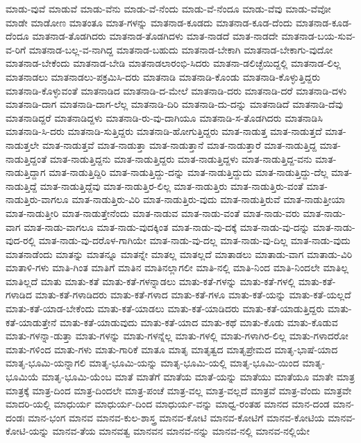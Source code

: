 {ಮಾಡು-ವುವೆ
ಮಾಡುವೆ
ಮಾಡು-ವೆನು
ಮಾಡು-ವೆ-ನೆಂದು
ಮಾಡು-ವೆ-ನೆಂದೂ
ಮಾಡು-ವೆವು
ಮಾಡು-ವೆವೋ
ಮಾಡೇ
ಮಾಡೋಣ
ಮಾತಂತೂ
ಮಾತ-ಗಳನ್ನು
ಮಾತನಾಡ-ಕೂಡದು
ಮಾತನಾಡ-ಕೂಡ-ದೆಂದು
ಮಾತನಾಡ-ಕೂಡ-ದೆಂದೂ
ಮಾತನಾಡ-ತೊಡಗಿದರು
ಮಾತನಾಡ-ತೊಡಗಿದಳು
ಮಾತ-ನಾಡದೆ
ಮಾತ-ನಾಡದೇ
ಮಾತನಾಡ-ಬಯ-ಸುವ-ವ-ರಿಗೆ
ಮಾತನಾಡ-ಬಲ್ಲ-ವ-ನಾಗಿದ್ದ
ಮಾತನಾಡ-ಬಹುದು
ಮಾತನಾಡ-ಬೇಕಾಗಿ
ಮಾತನಾಡ-ಬೇಕಾಗು-ವುದೋ
ಮಾತನಾಡ-ಬೇಕೆಂದು
ಮಾತನಾಡ-ಬೇಡಿ
ಮಾತನಾಡಲಾರಂಭಿ-ಸಿದರು
ಮಾತನಾ-ಡಲಿಚ್ಛೆಯಿದ್ದಲ್ಲಿ
ಮಾತನಾಡ-ಲಿಲ್ಲ
ಮಾತನಾಡಲು
ಮಾತನಾಡಲು-ಪಕ್ರಮಿಸಿ-ದರು
ಮಾತನಾಡಿ
ಮಾತನಾಡಿ-ಕೊಂಡು
ಮಾತನಾಡಿ-ಕೊಳ್ಳುತ್ತಿದ್ದರು
ಮಾತನಾಡಿ-ಕೊಳ್ಳುವಂತೆ
ಮಾತನಾಡಿದ
ಮಾತನಾಡಿ-ದ-ಮೇಲೆ
ಮಾತನಾಡಿ-ದರು
ಮಾತನಾಡಿ-ದರೆ
ಮಾತನಾಡಿ-ದಳು
ಮಾತನಾಡಿ-ದಾಗ
ಮಾತನಾಡಿ-ದಾಗ-ಲೆಲ್ಲ
ಮಾತನಾಡಿ-ದಿರಿ
ಮಾತನಾಡಿ-ದು-ದನ್ನು
ಮಾತನಾಡಿದೆ
ಮಾತನಾಡಿ-ದೆವು
ಮಾತನಾಡಿದ್ದರೆ
ಮಾತನಾಡಿದ್ದಳು
ಮಾತನಾಡಿ-ರು-ವು-ದಾಗಿಯೂ
ಮಾತನಾಡಿ-ಸ-ತೊಡಗಿದರು
ಮಾತನಾಡಿಸಿ
ಮಾತನಾಡಿ-ಸಿ-ದರು
ಮಾತನಾಡಿ-ಸುತ್ತಿದ್ದರು
ಮಾತನಾಡಿ-ಹೋಗುತ್ತಿದ್ದರು
ಮಾತ-ನಾಡುತ್ತ
ಮಾತ-ನಾಡುತ್ತದೆ
ಮಾತ-ನಾಡುತ್ತಲೇ
ಮಾತ-ನಾಡುತ್ತವೆ
ಮಾತ-ನಾಡುತ್ತಾ
ಮಾತ-ನಾಡುತ್ತಾನೆ
ಮಾತ-ನಾಡುತ್ತಾರೆ
ಮಾತ-ನಾಡುತ್ತಿದ್ದ
ಮಾತ-ನಾಡುತ್ತಿದ್ದಂತೆ
ಮಾತ-ನಾಡುತ್ತಿದ್ದನು
ಮಾತ-ನಾಡುತ್ತಿದ್ದರು
ಮಾತ-ನಾಡುತ್ತಿದ್ದಳು
ಮಾತ-ನಾಡುತ್ತಿದ್ದ-ವನು
ಮಾತ-ನಾಡುತ್ತಿದ್ದಾಗ
ಮಾತ-ನಾಡುತ್ತಿದ್ದಿರಿ
ಮಾತ-ನಾಡುತ್ತಿದ್ದು-ದನ್ನು
ಮಾತ-ನಾಡುತ್ತಿದ್ದುದು
ಮಾತ-ನಾಡುತ್ತಿದ್ದು-ದೆಲ್ಲ
ಮಾತ-ನಾಡುತ್ತಿದ್ದೆ
ಮಾತ-ನಾಡುತ್ತಿದ್ದೆವು
ಮಾತ-ನಾಡುತ್ತಿರ-ಲಿಲ್ಲ
ಮಾತ-ನಾಡುತ್ತಿರು
ಮಾತ-ನಾಡುತ್ತಿರು-ವಂತೆ
ಮಾತ-ನಾಡುತ್ತಿರು-ವಾಗಲೂ
ಮಾತ-ನಾಡುತ್ತಿರು-ವಿರಿ
ಮಾತ-ನಾಡುತ್ತಿರು-ವುದು
ಮಾತ-ನಾಡುತ್ತಿರುವೆ
ಮಾತ-ನಾಡುತ್ತೀಯಾ
ಮಾತ-ನಾಡುತ್ತೀರಿ
ಮಾತ-ನಾಡುತ್ತೇನೆಂದು
ಮಾತ-ನಾಡುವ
ಮಾತ-ನಾಡು-ವಂತೆ
ಮಾತ-ನಾಡು-ವರು
ಮಾತ-ನಾಡು-ವಾಗ
ಮಾತ-ನಾಡು-ವಾಗಲೂ
ಮಾತ-ನಾಡು-ವುದಕ್ಕಿಂತ
ಮಾತ-ನಾಡು-ವು-ದಕ್ಕೆ
ಮಾತ-ನಾಡು-ವು-ದನ್ನು
ಮಾತ-ನಾಡು-ವುದ-ರಲ್ಲಿ
ಮಾತ-ನಾಡು-ವು-ದರೊಳ-ಗಾಗಿಯೇ
ಮಾತ-ನಾಡು-ವು-ದಲ್ಲ
ಮಾತ-ನಾಡು-ವು-ದಿಲ್ಲ
ಮಾತ-ನಾಡು-ವುದು
ಮಾತನಾಡೆಂದು
ಮಾತನ್ನು
ಮಾತನ್ನೂ
ಮಾತನ್ನೇ
ಮಾತಲ್ಲ
ಮಾತಲ್ಲದೆ
ಮಾತಾಡಲು
ಮಾತಾಡು-ವಾಗ
ಮಾತಾಡು-ವಿರಿ
ಮಾತಾಳಿ-ಗಳು
ಮಾತಿ-ಗಿಂತ
ಮಾತಿಗೆ
ಮಾತಿನ
ಮಾತಿನಲ್ಲಾಗಲೀ
ಮಾತಿ-ನಲ್ಲಿ
ಮಾತಿ-ನಿಂದ
ಮಾತಿ-ನಿಂದಲೇ
ಮಾತಿಲ್ಲ
ಮಾತಿಲ್ಲದೆ
ಮಾತು
ಮಾತು-ಕತೆ
ಮಾತು-ಕತೆ-ಗಳನ್ನಾಡಲು
ಮಾತು-ಕತೆ-ಗಳನ್ನು
ಮಾತು-ಕತೆ-ಗಳಲ್ಲಿ
ಮಾತು-ಕತೆ-ಗಳಾಡಿದ
ಮಾತು-ಕತೆ-ಗಳಾಡಿದರು
ಮಾತು-ಕತೆ-ಗಳಾದ
ಮಾತು-ಕತೆ-ಗಳೂ
ಮಾತು-ಕತೆ-ಯನ್ನು
ಮಾತು-ಕತೆ-ಯಲ್ಲದೆ
ಮಾತು-ಕತೆ-ಯಾಡ-ಬೇಕೆಂದು
ಮಾತು-ಕತೆ-ಯಾಡಲು
ಮಾತು-ಕತೆ-ಯಾಡಿದರು
ಮಾತು-ಕತೆ-ಯಾಡುತ್ತಿದ್ದರು
ಮಾತು-ಕತೆ-ಯಾಡುತ್ತೇನೆ
ಮಾತು-ಕತೆ-ಯಾಡುವುದು
ಮಾತು-ಕತೆ-ಯಾದ
ಮಾತು-ಕಥೆ
ಮಾತು-ಕೊಡು
ಮಾತು-ಕೊಡುವ
ಮಾತು-ಗಳನ್ನಾ-ಡುತ್ತಾ
ಮಾತು-ಗಳನ್ನು
ಮಾತು-ಗಳನ್ನೆಲ್ಲ
ಮಾತು-ಗಳಲ್ಲಿ
ಮಾತು-ಗಳಾಗಿರ-ಲಿಲ್ಲ
ಮಾತು-ಗಳಾದರೋ
ಮಾತು-ಗಳಿಂದ
ಮಾತು-ಗಳು
ಮಾತು-ಗಾರಿಕೆ
ಮಾತೂ
ಮಾತೃ
ಮಾತೃತ್ವದ
ಮಾತೃಪ್ರೇಮದ
ಮಾತೃ-ಭಾಷೆ-ಯಾದ
ಮಾತೃ-ಭೂಮಿ-ಯನ್ನಾಗಲಿ
ಮಾತೃ-ಭೂಮಿ-ಯನ್ನು
ಮಾತೃ-ಭೂಮಿ-ಯಲ್ಲಿ
ಮಾತೃ-ಭೂಮಿ-ಯಿಂದ
ಮಾತೃ-ಭೂಮಿಯೆ
ಮಾತೃ-ಭೂಮಿ-ಯೆಂಬ
ಮಾತೆ
ಮಾತೆಗೆ
ಮಾತೆಯ
ಮಾತೆ-ಯನ್ನು
ಮಾತೆಯು
ಮಾತೆಯೂ
ಮಾತೇ
ಮಾತ್ರ
ಮಾತ್ರಕ್ಕೆ
ಮಾತ್ರ-ದಿಂದ
ಮಾತ್ರ-ದಿಂದಲೇ
ಮಾತ್ರ-ಪಂಚೆ
ಮಾತ್ರ-ವಲ್ಲ
ಮಾತ್ರ-ವಲ್ಲದೆ
ಮಾತ್ರವೆ
ಮಾತ್ರ-ವೆಂದು
ಮಾತ್ರವೇ
ಮಾದರಿ-ಯಲ್ಲಿ
ಮಾಧುರ್ಯ
ಮಾಧುರ್ಯ-ದಿಂದ
ಮಾಧುರ್ಯ-ವನ್ನು
ಮಾಧ್ವ-ರಂತಹ
ಮಾನದ
ಮಾನ-ದಂಡ
ಮಾನ-ದಂಡಃ
ಮಾನ-ಭಂಗ
ಮಾನವ
ಮಾನವ-ಕುಲ-ಶಾಸ್ತ್ರ
ಮಾನವ-ಕೋಟಿ
ಮಾನವ-ಕೋಟಿಗೆ
ಮಾನವ-ಕೋಟಿಯ
ಮಾನವ-ಕೋಟಿ-ಯನ್ನು
ಮಾನವ-ತೆಯ
ಮಾನವತ್ವ
ಮಾನವನ
ಮಾನವ-ನನ್ನು
ಮಾನವ-ನಲ್ಲಿ
ಮಾನವ-ನಲ್ಲಿಯೇ
}
